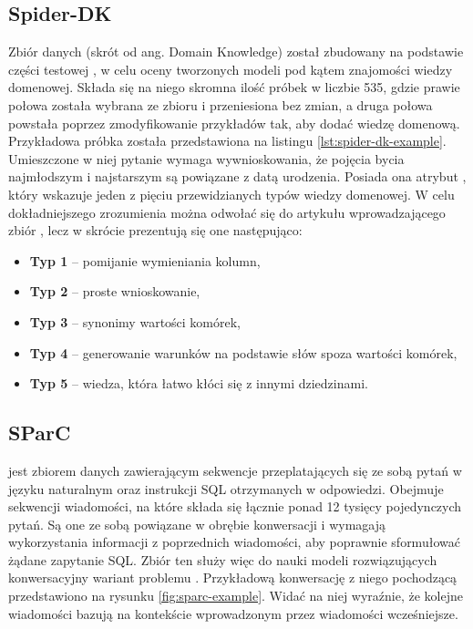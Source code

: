 \begin{minipage}{\linewidth}

\end{minipage}

\subsection{Spider-DK}
Zbiór danych   (skrót od ang. Domain Knowledge) został zbudowany na podstawie części testowej , w celu oceny tworzonych modeli pod kątem znajomości wiedzy domenowej. Składa się na niego skromna ilość próbek w liczbie 535, gdzie prawie połowa została wybrana ze zbioru  i przeniesiona bez zmian, a druga połowa powstała poprzez zmodyfikowanie przykładów tak, aby dodać wiedzę domenową. Przykładowa próbka została przedstawiona na listingu \ref{lst:spider-dk-example}. Umieszczone w niej pytanie wymaga wywnioskowania, że pojęcia bycia najmłodszym i najstarszym są powiązane z datą urodzenia. Posiada ona atrybut , który wskazuje jeden z pięciu przewidzianych typów wiedzy domenowej. W celu dokładniejszego zrozumienia można odwołać się do artykułu wprowadzającego zbiór , lecz w skrócie prezentują się one następująco:
\begin{itemize}
    \item \textbf{Typ 1} -- pomijanie wymieniania kolumn,
    \item \textbf{Typ 2} -- proste wnioskowanie,
    \item \textbf{Typ 3} -- synonimy wartości komórek,
    \item \textbf{Typ 4} -- generowanie warunków na podstawie słów spoza wartości komórek,
    \item \textbf{Typ 5} -- wiedza, która łatwo kłóci się z innymi dziedzinami.
\end{itemize}

\begin{minipage}{\linewidth}

\end{minipage}

\subsection{SParC}
  jest zbiorem danych zawierającym sekwencje przeplatających się ze sobą pytań w języku naturalnym oraz instrukcji SQL otrzymanych w odpowiedzi. Obejmuje  sekwencji wiadomości, na które składa się łącznie ponad 12 tysięcy pojedynczych pytań. Są one ze sobą powiązane w obrębie konwersacji i wymagają wykorzystania informacji z poprzednich wiadomości, aby poprawnie sformułować żądane zapytanie SQL. Zbiór ten służy więc do nauki modeli rozwiązujących konwersacyjny wariant problemu . Przykładową konwersację z niego pochodzącą przedstawiono na rysunku \ref{fig:sparc-example}. Widać na niej wyraźnie, że kolejne wiadomości bazują na kontekście wprowadzonym przez wiadomości wcześniejsze.

